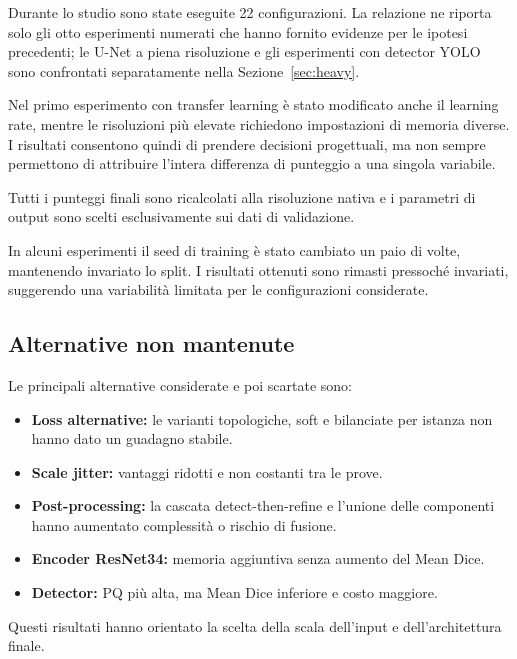 Durante lo studio sono state eseguite 22 configurazioni. La relazione ne riporta
solo gli otto esperimenti numerati che hanno fornito evidenze
per le ipotesi precedenti; le U-Net a piena risoluzione e gli esperimenti con detector
YOLO sono confrontati separatamente nella Sezione~\ref{sec:heavy}.

Nel primo esperimento con transfer learning è stato modificato anche il learning rate,
mentre le
risoluzioni più elevate richiedono impostazioni di memoria diverse. I risultati
consentono quindi di prendere decisioni progettuali, ma non sempre permettono di
attribuire l'intera differenza di punteggio a una singola variabile.

Tutti i punteggi finali sono ricalcolati alla risoluzione nativa e i parametri di output
sono scelti esclusivamente sui dati di validazione.

In alcuni esperimenti il seed di training è stato cambiato un paio di volte, mantenendo
invariato lo split. I risultati ottenuti sono rimasti pressoché invariati, suggerendo una
variabilità limitata per le configurazioni considerate.

\subsection{Alternative non mantenute}

Le principali alternative considerate e poi scartate sono:

\begin{itemize}
\setlength{\itemsep}{0.1em}
\item \textbf{Loss alternative:} le varianti topologiche, soft e bilanciate per istanza non hanno dato un guadagno stabile.
\item \textbf{Scale jitter:} vantaggi ridotti e non costanti tra le prove.
\item \textbf{Post-processing:} la cascata detect-then-refine e l'unione delle componenti hanno aumentato complessità o rischio di fusione.
\item \textbf{Encoder ResNet34:} memoria aggiuntiva senza aumento del Mean Dice.
\item \textbf{Detector:} PQ più alta, ma Mean Dice inferiore e costo maggiore.
\end{itemize}

Questi risultati hanno orientato la scelta della scala dell'input e dell'architettura finale.
